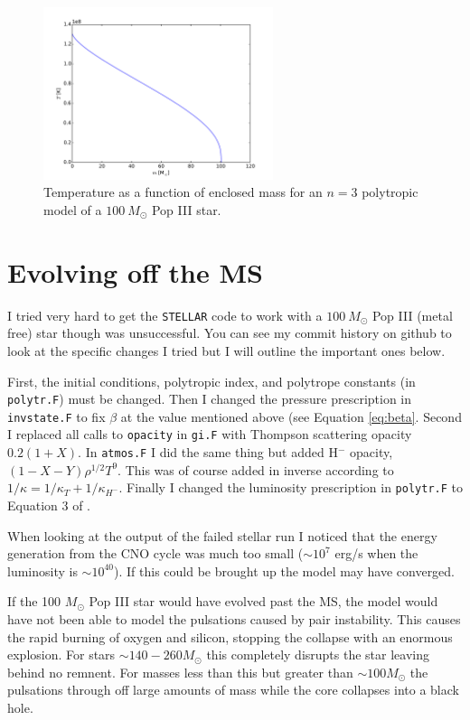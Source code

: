 \documentclass[12pt]{paper}
\begin{document}
\begin{figure}
\begin{center}
    \includegraphics[width=0.6\textwidth]{temperature3p0.pdf}
    \caption{Temperature as a function of enclosed mass for an $n=3$ polytropic model of a $100~M_\odot$ Pop III star.}
    \label{fig:tm}
\end{center}
\end{figure}

\section{Evolving off the MS}
I tried very hard to get the \texttt{STELLAR} code to work with a $100~M_\odot$ Pop III (metal free) star though was unsuccessful. You can see my commit history on github to look at the specific changes I tried but I will outline the important ones below. 

First, the initial conditions, polytropic index, and polytrope constants (in \texttt{polytr.F}) must be changed. Then I changed the pressure prescription in \texttt{invstate.F} to fix $\beta$ at the value mentioned above (see Equation \ref{eq:beta}. Second I replaced all calls to \texttt{opacity} in \texttt{gi.F} with Thompson scattering opacity $0.2(1+X)$. In \texttt{atmos.F} I did the same thing but added H$^-$ opacity, $(1-X-Y)\rho^{1/2}T^9$. This was of course added in inverse according to $1/\kappa=1/\kappa_T+1/\kappa_{H^-}$. Finally I changed the luminosity prescription in \texttt{polytr.F} to Equation 3 of \citet{BKL}. 

When looking at the output of the failed stellar run I noticed that the energy generation from the CNO cycle was much too small ($\sim 10^7$ erg/s when the luminosity is $\sim10^{40}$). If this could be brought up the model may have converged.

If the 100 $M_\odot$ Pop III star would have evolved past the MS, the model would have not been able to model the pulsations caused by pair instability. This causes the rapid burning of oxygen and silicon, stopping the collapse with an enormous explosion. For stars $\sim 140-260 M_\odot$ \citep{pop3}this completely disrupts the star leaving behind no remnent. For masses less than this but greater than $\sim 100 M_\odot$ the pulsations through off large amounts of mass while the core collapses into a black hole.
\end{document}
